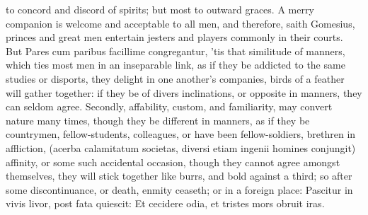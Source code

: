 {to concord and discord of spirits; but most to outward graces. A merry
companion is welcome and acceptable to all men, and therefore, saith
Gomesius, princes and great men entertain jesters and players
commonly in their courts. But Pares cum paribus facillime
congregantur, 'tis that similitude of manners, which ties most
men in an inseparable link, as if they be addicted to the same studies
or disports, they delight in one another's companies, birds of a
feather will gather together: if they be of divers inclinations, or
opposite in manners, they can seldom agree. Secondly, affability,
custom, and familiarity, may convert nature many times, though they be
different in manners, as if they be countrymen, fellow-students,
colleagues, or have been fellow-soldiers, brethren in affliction,
(acerba calamitatum societas, diversi etiam ingenii homines
conjungit) affinity, or some such accidental occasion, though they
cannot agree amongst themselves, they will stick together like burrs,
and bold against a third; so after some discontinuance, or death,
enmity ceaseth; or in a foreign place:
Pascitur in vivis livor, post fata quiescit:
Et cecidere odia, et tristes mors obruit iras.

}
